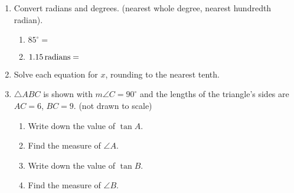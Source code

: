 \documentclass[12pt, twoside]{article}
\begin{document}
\begin{enumerate}
\item Convert radians and degrees. (nearest whole degree, nearest hundredth radian).\vspace{.25cm}
  \begin{multicols}{2}
    \begin{enumerate}
      \item $85^\circ = $ \vspace{1cm}
      \item $\displaystyle 1.15 \,\rm{radians}=$ \vspace{1cm}
    \end{enumerate}
  \end{multicols} \vspace{2cm}


\item Solve each equation for $x$, rounding to the nearest tenth.
  \begin{enumerate}
  \end{enumerate}
  \vspace{3cm}

\newpage
\item $\triangle ABC$ is shown with $m\angle C=90^\circ$ and the lengths of the triangle's sides are $AC=6$, $BC=9$.  \hfill (not drawn to scale)
  \begin{multicols}{2}
    \begin{enumerate}
      \item Write down the value of $\tan A$. \vspace{1.25cm}
      \item Find the measure of $\angle A$. \vspace{1cm}
      \item Write down the value of $\tan B$. \vspace{1.25cm}
      \item Find the measure of $\angle B$. \vspace{1cm}
    \end{enumerate}
    \begin{flushright}
    \end{flushright}
  \end{multicols}
  \vspace{2cm}
  


\end{enumerate}
\end{document}
